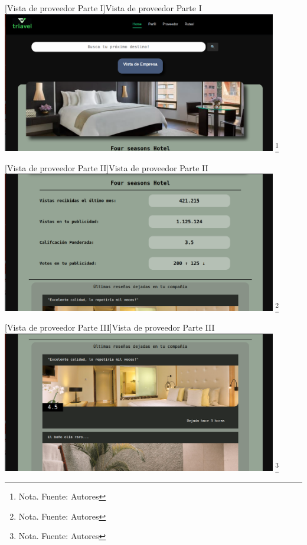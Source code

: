      \vspace{2mm}
    \begin{minipage}{0.9\textwidth}
    \centering
    [{Vista de proveedor Parte I}]{Vista de proveedor Parte I}
    \label{prot5}
    \includegraphics[width=0.9\textwidth]{Content/Images/VistaProveedor1.png}
    \footnote{Nota. \textup{Fuente: Autores}}
    \end{minipage}

     \vspace{2mm}
    \begin{minipage}{0.9\textwidth}
    \centering
    [{Vista de proveedor Parte II}]{Vista de proveedor Parte II}
    \label{prot6}
    \includegraphics[width=0.9\textwidth]{Content/Images/VistaProveedor2.png}
    \footnote{Nota. \textup{Fuente: Autores}}
    \end{minipage}

     \vspace{2mm}
    \begin{minipage}{0.9\textwidth}
    \centering
    [{Vista de proveedor Parte III}]{Vista de proveedor Parte III}
    \label{prot7}
    \includegraphics[width=0.9\textwidth]{Content/Images/VistaProveedor3.png}
    \footnote{Nota. \textup{Fuente: Autores}}
    \end{minipage}

